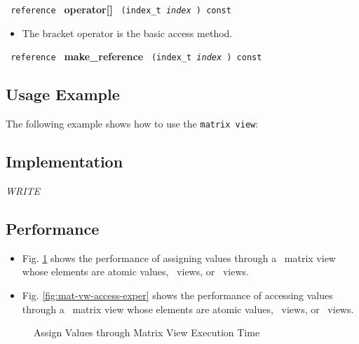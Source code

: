 \noindent
\texttt{%
reference
}
\newline
\textbf{operator[]}%
\texttt{%
(index\_t
\textit{index}%
) const
}

\begin{itemize}
\item
The bracket operator is the basic access method.
\end{itemize}

\noindent
\texttt{%
reference
}
\newline
\textbf{make\_reference}%
\texttt{%
(index\_t
\textit{index}%
) const
}

\subsection{Usage Example} \label{sec-mat-vw-use}

The following example shows how to use the \texttt{matrix view}:


\subsection{Implementation} \label{sec-mat-vw-impl}

\textit{WRITE}

\subsection{Performance} \label{sec-mat-vw-perf}

\begin{itemize}
\item
Fig. \ref{fig:mat-vw-assign-exper}
shows the performance of assigning values through a \stapl\ matrix view
whose elements are atomic values, \stl\ views, or \stapl\ views.
\item
Fig. \ref{fig:mat-vw-access-exper}
shows the performance of accessing values through a \stapl\ matrix view
whose elements are atomic values, \stl\ views, or \stapl\ views.
\end{itemize}

\begin{figure}[p]
\caption{Assign Values through Matrix View Execution Time}
\label{fig:mat-vw-assign-exper}
\end{figure}

